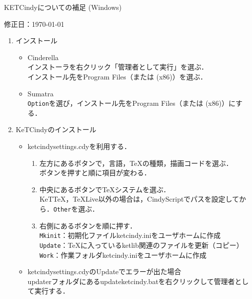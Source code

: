 \documentclass{ujarticle}
\begin{document}
\begin{center}
KETCindyについての補足 (Windows)
\end{center}

\hfill 修正日：\today

\begin{enumerate}[\bf\large 1.]

\item インストール
\begin{itemize}
\item Cinderella\\
\hspace*{10mm}インストーラを右クリック「管理者として実行」を選ぶ．\\
\hspace*{10mm}インストール先をProgram Files（または (x86)）を選ぶ．
\item Sumatra\\
\hspace*{10mm}\verb|Option|を選び，インストール先をProgram Files（または (x86)）にする．
\end{itemize}

\item KeTCindyのインストール
\begin{itemize}
\item ketcindysettings.cdyを利用する．
\begin{enumerate}[(1)]
\item 左方にあるボタンで，言語，TeXの種類，描画コードを選ぶ．\\
\hspace*{10mm}ボタンを押すと順に項目が変わる．
\item 中央にあるボタンでTeXシステムを選ぶ．\\
\hspace*{10mm}KeTTeX，TeXLive以外の場合は，CindyScriptでパスを設定してから．\verb|Other|を選ぶ．
\item 右側にあるボタンを順に押す．\\
\hspace*{10mm}\verb|Mkinit|：初期化ファイルketcindy.iniをユーザホームに作成\\
\hspace*{10mm}\verb|Update|：TeXに入っているketlib関連のファイルを更新（コピー）\\
\hspace*{10mm}\verb|Work|：作業フォルダketcindy.iniをユーザホームに作成
\end{enumerate}
\item ketcindysettings.cdyのUpdateでエラーが出た場合\\
\hspace*{10mm}updaterフォルダにあるupdateketcindy.batを右クリックして管理者として実行する．
\end{itemize}


\end{enumerate}
\end{document}
